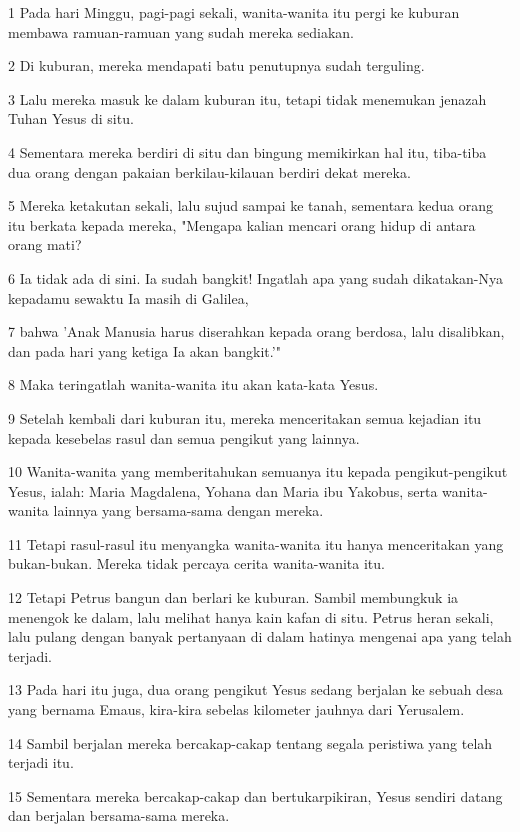 \par 1 Pada hari Minggu, pagi-pagi sekali, wanita-wanita itu pergi ke kuburan membawa ramuan-ramuan yang sudah mereka sediakan.
\par 2 Di kuburan, mereka mendapati batu penutupnya sudah terguling.
\par 3 Lalu mereka masuk ke dalam kuburan itu, tetapi tidak menemukan jenazah Tuhan Yesus di situ.
\par 4 Sementara mereka berdiri di situ dan bingung memikirkan hal itu, tiba-tiba dua orang dengan pakaian berkilau-kilauan berdiri dekat mereka.
\par 5 Mereka ketakutan sekali, lalu sujud sampai ke tanah, sementara kedua orang itu berkata kepada mereka, "Mengapa kalian mencari orang hidup di antara orang mati?
\par 6 Ia tidak ada di sini. Ia sudah bangkit! Ingatlah apa yang sudah dikatakan-Nya kepadamu sewaktu Ia masih di Galilea,
\par 7 bahwa 'Anak Manusia harus diserahkan kepada orang berdosa, lalu disalibkan, dan pada hari yang ketiga Ia akan bangkit.'"
\par 8 Maka teringatlah wanita-wanita itu akan kata-kata Yesus.
\par 9 Setelah kembali dari kuburan itu, mereka menceritakan semua kejadian itu kepada kesebelas rasul dan semua pengikut yang lainnya.
\par 10 Wanita-wanita yang memberitahukan semuanya itu kepada pengikut-pengikut Yesus, ialah: Maria Magdalena, Yohana dan Maria ibu Yakobus, serta wanita-wanita lainnya yang bersama-sama dengan mereka.
\par 11 Tetapi rasul-rasul itu menyangka wanita-wanita itu hanya menceritakan yang bukan-bukan. Mereka tidak percaya cerita wanita-wanita itu.
\par 12 Tetapi Petrus bangun dan berlari ke kuburan. Sambil membungkuk ia menengok ke dalam, lalu melihat hanya kain kafan di situ. Petrus heran sekali, lalu pulang dengan banyak pertanyaan di dalam hatinya mengenai apa yang telah terjadi.
\par 13 Pada hari itu juga, dua orang pengikut Yesus sedang berjalan ke sebuah desa yang bernama Emaus, kira-kira sebelas kilometer jauhnya dari Yerusalem.
\par 14 Sambil berjalan mereka bercakap-cakap tentang segala peristiwa yang telah terjadi itu.
\par 15 Sementara mereka bercakap-cakap dan bertukarpikiran, Yesus sendiri datang dan berjalan bersama-sama mereka.
